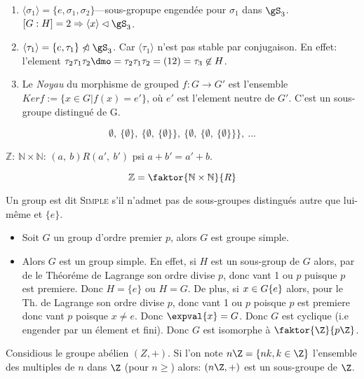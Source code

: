 \begin{examplebox}
	\begin{enumerate}
		\item $\langle \sigma_1 \rangle=\{e,\sigma_1,\sigma_2\}$---sous-gropupe engendée pour $\sigma_1$ dans $\gS_3$. $[G:H]=2\Rightarrow \langle x\rangle\lhd\gS_3$.
		\item $\langle \tau_1\rangle=\{e,\tau_1\}\ntriangleleft\gS_3$. Car $\langle \tau_1 \rangle$ n'est pas stable par conjugaison. En effet: l'element $\tau_2\tau_1\tau_2\dmo =\tau_2\tau_1\tau_2=(12)=\tau_3\not\in H$.
		\item Le \emph{Noyau} du morphisme de grouped $f:G\rightarrow G'$ est l'ensemble $Ker f:=\{x\in G | f(x)=e'\}$, où $e'$ est l'element neutre de $G'$. C'est un sous-groupe distingué de G.
	\end{enumerate}
\end{examplebox}

\ifcomment
$$\emptyset,\ \{\emptyset\},\ \{\emptyset,\ \{\emptyset\}\},\ \{\emptyset,\ \{\emptyset,\ \{\emptyset\}\}\},\ ...$$

$\mathbb{Z}$: $\mathbb{N}\times\mathbb{N}$:
$(a,\ b)R(a',\ b')$ psi $a+b'=a' + b$.

$$\mathbb{Z}=\faktor{\mathbb{N}\times\mathbb{N}}{R}$$
\fi


\begin{definition}
	Un group est dit \textsc{Simple} s'il n'admet pas de sous-groupes distingués autre que lui-même et $\{e\}$.
\end{definition}

\begin{examplebox}
	\begin{itemize}
		\item Soit $G$ un group d'ordre premier $p$, alors $G$ est groupe simple.
		\item Alors $G$ est un group simple. En effet, si $H$ est un sous-group de $G$ alors, par de le Théoréme de Lagrange son ordre divise $p$, donc vant 1 ou $p$ puisque $p$ est premiere. Donc $H=\{e\}$ ou $H=G$. De plus, si $x\in G\\ \{e\}$ alors, pour le Th. de Lagrange son ordre divise $p$, donc vant 1 ou $p$ poisque $p$ est premiere donc vant $p$ poisque $x\neq e$. Donc $\expval{x}=G$. Donc $G$ est cyclique (i.e engender par un élement et fini). Donc $G$ est isomorphe à $\faktor{\Z}{p\Z}$.
	\end{itemize}
\end{examplebox}

Considious le groupe abélien $(Z, +)$. Si l'on note $n\Z=\{nk, k\in\Z\}$ l'ensemble des multiples de $n$ dans $\Z$ (pour $n\geq$) alors: $(n\Z,+)$ est un sous-groupe de $\Z$.

